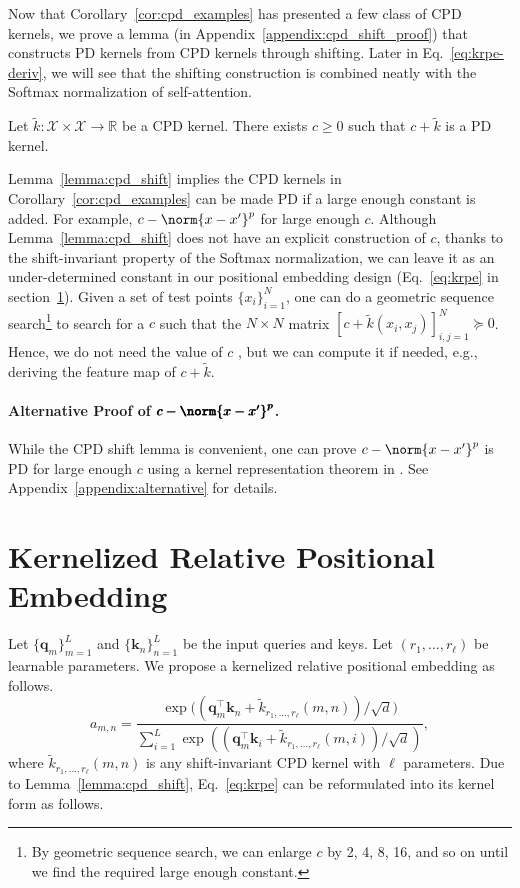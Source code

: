 Now that Corollary~\ref{cor:cpd_examples} has presented a few class of CPD kernels, we prove a lemma (in Appendix~\ref{appendix:cpd_shift_proof}) that constructs PD kernels from CPD kernels through shifting. Later in Eq.~\eqref{eq:krpe-deriv}, we will see that the shifting construction is combined neatly with the Softmax normalization of self-attention.
\begin{lemma}
	Let $\tilde{k}:\mathcal{X}\times\mathcal{X}\rightarrow\mathbb{R}$ be a CPD kernel. There exists $c\geq 0$ such that $c+\tilde{k}$ is a PD kernel.
	\label{lemma:cpd_shift}
\end{lemma}
Lemma~\ref{lemma:cpd_shift} implies the CPD kernels in Corollary~\ref{cor:cpd_examples} can be made PD if a large enough constant is added. For example, $c-\norm{x-x'}^p$ for large enough $c$. Although Lemma~\ref{lemma:cpd_shift} does not have an explicit construction of $c$, thanks to the shift-invariant property of the Softmax normalization, we can leave it as an under-determined constant in our positional embedding design (Eq.~\eqref{eq:krpe} in section~\ref{sec:krpe}). Given a set of test points $\{x_i\}_{i=1}^N$, one can do a geometric sequence search\footnote{By geometric sequence search, we can enlarge $c$ by 2, 4, 8, 16, and so on until we find the required large enough constant.} to search for a $c$ such that the $N\times N$ matrix $[c+\tilde{k}(x_i,x_j)]_{i,j=1}^N\succeq 0$. Hence, we do not need the value of $c$ , but we can compute it if needed, e.g., deriving the feature map of $c+\tilde{k}$.

\paragraph{Alternative Proof of $\pmb{c-\norm{x-x'}^p}$.} While the CPD shift lemma is convenient, one can prove $c-\norm{x-x'}^p$ is PD for large enough $c$ using a kernel representation theorem in \citet{schoenberg1938metric}. See Appendix~\ref{appendix:alternative} for details.

\section{Kernelized Relative Positional Embedding}
\label{sec:krpe}
Let $\{\bm q_m\}_{m=1}^L$ and $\{\bm k_n\}_{n=1}^L$ be the input queries and keys. Let $(r_1,...,r_\ell)$ be learnable parameters. We propose a kernelized relative positional embedding as follows.
\begin{equation}
    a_{m,n}=\frac{\exp\big((\bm q_m^\top \bm k_n  +\tilde{k}_{r_1,...,r_\ell}(m,n))/\sqrt{d}\big)}{\sum_{i=1}^L \exp((\bm q_m^\top \bm k_i+\tilde{k}_{r_1,...,r_\ell}(m,i))/\sqrt{d})},
    \label{eq:krpe}
\end{equation}
where $\tilde{k}_{r_1,...,r_\ell}(m,n)$ is any shift-invariant CPD kernel with $\ell$ parameters. Due to Lemma~\ref{lemma:cpd_shift}, Eq.~\eqref{eq:krpe} can be reformulated into its kernel form as follows.

